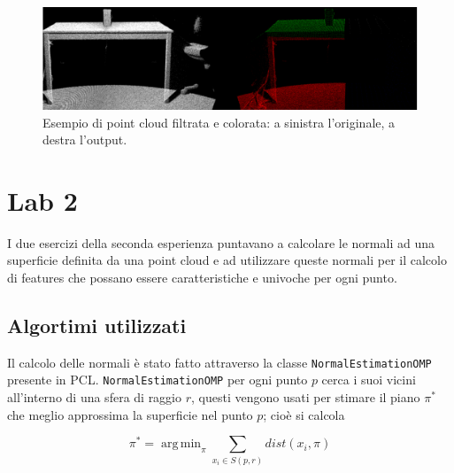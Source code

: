 \documentclass[a4paper]{article}
\DeclareMathOperator*{\argmin}{arg\,min}
\begin{document}
	\begin{figure}
		\centering
		\includegraphics[width=1\textwidth]{images/lab1.png}
		\caption{\label{fig:lab1}Esempio di point cloud filtrata e colorata: a sinistra l'originale, a destra l'output.}
	\end{figure}


\section{Lab 2} \label{sec:lab2}
I due esercizi della seconda esperienza puntavano a calcolare le normali ad una superficie definita da una point cloud e ad utilizzare queste normali per il calcolo di features che possano essere caratteristiche e univoche per ogni punto.

	\subsection{Algortimi utilizzati} \label{sec:lab2_alg}
	Il calcolo delle normali è stato fatto attraverso la classe \verb|NormalEstimationOMP| presente in PCL. \verb|NormalEstimationOMP| per ogni punto $p$ cerca i suoi vicini all'interno di una sfera di raggio $r$, questi vengono usati per stimare il piano $\pi^*$ che meglio approssima la superficie nel punto $p$; cioè si calcola 
	
	\begin{equation}
	\pi^* = \argmin_{\pi}{\sum_{x_i \in S(p,r)}{dist(x_i,\pi)}}
	\end{equation}
	
\end{document}
